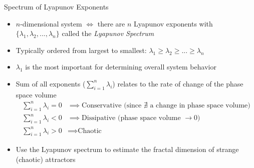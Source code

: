\documentclass{beamer}
\begin{document}
\begin{frame}{Spectrum of Lyapunov Exponents}
\begin{itemize}
    \item $n$-dimensional system $\iff$ there are $n$ Lyapunov exponents with $\{\lambda_1, \lambda_2, ..., \lambda_n\}$ called the \textit{Lyapunov Spectrum}
    \item Typically ordered from largest to smallest: $\lambda_1 \geq \lambda_2 \geq ... \geq \lambda_n$
    \item $\lambda_1$ is the most important for determining overall system behavior
    \item Sum of all exponents ($\sum_{i=1}^n \lambda_i$) relates to the rate of change of the phase space volume
    \begin{align*}
        \sum_{i=1}^n \lambda_i=0  &\implies \text{Conservative (since $\nexists$ a change in phase space volume)}\\
        \sum_{i=1}^n \lambda_i<0 &\implies \text{Dissipative (phase space volume $\to 0$)}\\
        \sum_{i=1}^n \lambda_i >0 &\implies \text{Chaotic}
    \end{align*}
    \item Use the Lyapunov spectrum to estimate the fractal dimension of strange (chaotic) attractors
\end{itemize}
\end{frame}
\end{document}
